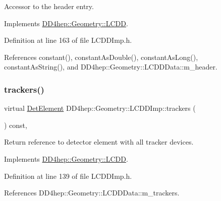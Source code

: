 Accessor to the header entry. 



Implements \hyperlink{class_d_d4hep_1_1_geometry_1_1_l_c_d_d_a9927ac6aeae1dad18e22413deba9aa65}{D\+D4hep\+::\+Geometry\+::\+L\+C\+DD}.



Definition at line 163 of file L\+C\+D\+D\+Imp.\+h.



References constant(), constant\+As\+Double(), constant\+As\+Long(), constant\+As\+String(), and D\+D4hep\+::\+Geometry\+::\+L\+C\+D\+D\+Data\+::m\+\_\+header.

\hypertarget{class_d_d4hep_1_1_geometry_1_1_l_c_d_d_imp_a49ddb87cd810770e46e5e97f8b861329}{}\label{class_d_d4hep_1_1_geometry_1_1_l_c_d_d_imp_a49ddb87cd810770e46e5e97f8b861329} 
\subsubsection{\texorpdfstring{trackers()}{trackers()}}
{\footnotesize\ttfamily virtual \hyperlink{class_d_d4hep_1_1_geometry_1_1_det_element}{Det\+Element} D\+D4hep\+::\+Geometry\+::\+L\+C\+D\+D\+Imp\+::trackers (\begin{DoxyParamCaption}{ }\end{DoxyParamCaption}) const\hspace{0.3cm}{\ttfamily [inline]}, {\ttfamily [virtual]}}



Return reference to detector element with all tracker devices. 



Implements \hyperlink{class_d_d4hep_1_1_geometry_1_1_l_c_d_d_a23b3868f3b09adccc62799612285c7db}{D\+D4hep\+::\+Geometry\+::\+L\+C\+DD}.



Definition at line 139 of file L\+C\+D\+D\+Imp.\+h.



References D\+D4hep\+::\+Geometry\+::\+L\+C\+D\+D\+Data\+::m\+\_\+trackers.

\hypertarget{class_d_d4hep_1_1_geometry_1_1_l_c_d_d_imp_a72808bae8f16fbf283a30af7a82e46cf}{}\label{class_d_d4hep_1_1_geometry_1_1_l_c_d_d_imp_a72808bae8f16fbf283a30af7a82e46cf} 
